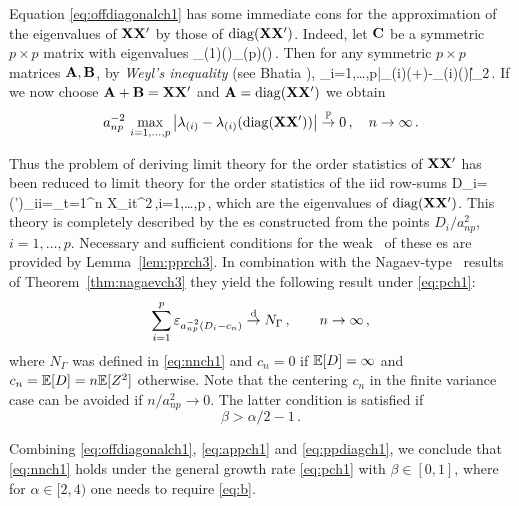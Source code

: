 Equation \eqref{eq:offdiagonalch1} has some immediate con\seq s for the approximation of the eigenvalues
of ${\mathbf X}{\mathbf X}'$ by those of ${\rm diag}({\mathbf X}{\mathbf X}')$. Indeed, let ${\mathbf C}$ be a symmetric $p\times p$ matrix with
eigenvalues 
\beam \label{eq:weylch1}
\la_{(1)}(\bfC)\ge \cdots \ge \la_{(p)}(\bfC)\,.
\eeam
Then for any symmetric $p\times p$ matrices ${\mathbf A},{\mathbf B}$, by {\em Weyl's inequality} (see Bhatia \cite{bhatia:1997}),
\beao
\max_{i=1,\ldots,p}\big|\la_{(i)}(\bfA+\bfB)-\la_{(i)}(\bfA)\big|\le \|\bfB\|_2\,.
\eeao
If we now choose
${\mathbf A}+{\mathbf B}={\mathbf X}{\mathbf X}'$ and ${\mathbf A}= \operatorname{diag} ({\mathbf X}{\mathbf X}')$ we obtain
\begin{equation}\label{eq:appch1}
a_{np}^{-2}\,\max_{i=1,\ldots,p}\big|\lambda_{(i)}-\lambda_{(i)}(\operatorname{diag}({\mathbf X}{\mathbf X}'))\big|\stackrel{\mathbb{P}}{\rightarrow} 0\,,\quad n \to \infty \,.
\end{equation}

Thus the problem of deriving limit theory for the order statistics of ${\mathbf X}{\mathbf X}'$ has been reduced to limit theory for the order
statistics of the iid row-sums
\beao
D_i= (\X\X')_{ii}=\sum_{t=1}^n X_{it}^2\,,\qquad i=1,\ldots,p\,,
\eeao
which are the eigenvalues of $\operatorname{diag}({\mathbf X}{\mathbf X}')$. 
This theory is completely described by the \pp es constructed from the points $D_i/a_{np}^2$, $i=1,\ldots,p$. Necessary
and sufficient conditions for the weak \con\ of these \pp es are provided by  Lemma~\ref{lem:pprch3}. In combination with the Nagaev-type \ld\ results of  Theorem~\ref{thm:nagaevch3} they yield the following result under \eqref{eq:pch1}:
\begin{equation}\label{eq:ppdiagch1}
\sum_{i=1}^p \varepsilon_{a_{np}^{-2}(D_i-c_n)}\stackrel{\rm d}{\rightarrow} N_{\Gamma}\,,\qquad n \to \infty\,,
\end{equation}
where $N_{\Gamma}$ was defined in \eqref{eq:nnch1} and  $c_n=0$ if $\mathbb{E}[D]=\infty$ and $c_n=\mathbb{E}[D]=n \mathbb{E}[Z^2]$ otherwise.
Note that the centering $c_n$ in the finite variance case can be avoided if $n/a_{np}^2\to 0$. The latter condition is satisfied if
\begin{equation}\label{eq:b}
\beta>\alpha/2-1\,.
\end{equation}

Combining \eqref{eq:offdiagonalch1}, \eqref{eq:appch1} and \eqref{eq:ppdiagch1}, we conclude that \eqref{eq:nnch1} holds under the general growth rate \eqref{eq:pch1} with $\beta\in [0,1]$, where for $\alpha\in [2,4)$ one needs to require \eqref{eq:b}.

